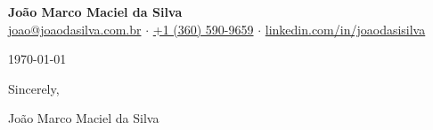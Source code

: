 \documentclass[11pt,letterpaper]{article}
\newcommand{\MYNAME}{João Marco Maciel da Silva}
\begin{document}
\begin{center}
\textbf{\Large{\MYNAME}}\\
\href{mailto:joao@joaodasilva.com.br}{joao@joaodasilva.com.br} $\cdot$
\href{tel:+13605909659}{+1 (360) 590-9659} $\cdot$
\href{https://www.linkedin.com/in/joaodasisilva}{linkedin.com/in/joaodasisilva}
\end{center}

\noindent\today

\vspace{0.3cm}



\vspace{0.3cm}

Sincerely,

\vspace{0.4cm}

\MYNAME
\end{document}
